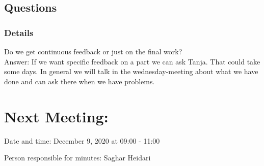 \documentclass[11pt]{meetingmins} %
\begin{document}
    
 \subsection{Questions}
 \subsubsection{Details}
 \begin{hiddensubitems}
 	\item Do we get continuous feedback or just on the final work?\\
 	Answer: If we want specific feedback on a part we can ask Tanja. That could take some days. In general we will talk in the wednesday-meeting about what we have done and can ask there when we have problems.
 \end{hiddensubitems}




\section{Next Meeting:}
    \begin{hiddensubitems}
        \item
            Date and time: December 9, 2020 at 09:00 - 11:00
        \item
            Person responsible for minutes: Saghar Heidari
    \end{hiddensubitems}
\end{document}
